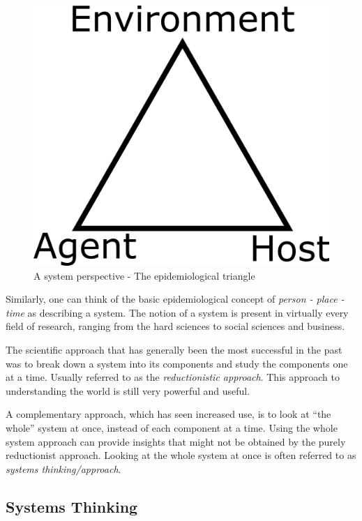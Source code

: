 \documentclass[]{article}
\theoremstyle{definition}
\theoremstyle{definition}
\theoremstyle{definition}
\theoremstyle{remark}
\begin{document}
\begin{figure}
\centering
\includegraphics{./images/epi-triangle.png}
\caption{\label{fig:epitriangle}A system perspective - The epidemiological
triangle}
\end{figure}

Similarly, one can think of the basic epidemiological concept of
\emph{person - place - time} as describing a system. The notion of a
system is present in virtually every field of research, ranging from the
hard sciences to social sciences and business.

The scientific approach that has generally been the most successful in
the past was to break down a system into its components and study the
components one at a time. Usually referred to as the
\emph{reductionistic approach}. This approach to understanding the world
is still very powerful and useful.

A complementary approach, which has seen increased use, is to look at
``the whole'' system at once, instead of each component at a time. Using
the whole system approach can provide insights that might not be
obtained by the purely reductionist approach. Looking at the whole
system at once is often referred to as \emph{systems thinking/approach}.

\subsection{Systems Thinking}\label{systems-thinking}
\end{document}

